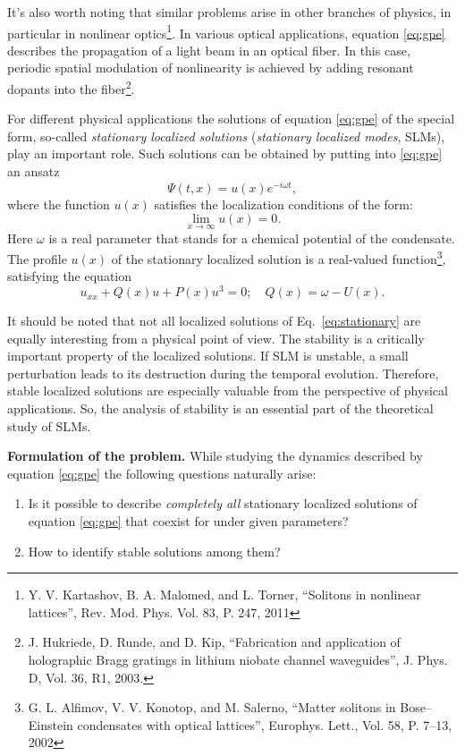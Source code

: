 \documentclass[candidate, href, colorlinks]{disser}
\begin{document}
It's also worth noting that similar problems arise in other branches of physics, in particular in nonlinear optics\footnote{\label{note:turner} Y. V. Kartashov, B. A. Malomed, and L. Torner, ``Solitons in nonlinear lattices'', Rev. Mod. Phys. Vol. 83, P. 247, 2011}.
In various optical applications, equation \eqref{eq:gpe} describes the propagation of a light beam in an optical fiber.
In this case, periodic spatial modulation of nonlinearity is achieved by adding resonant dopants into the fiber\footnote{J. Hukriede, D. Runde, and D. Kip, ``Fabrication and application of holographic Bragg gratings in lithium niobate channel waveguides'', J. Phys. D, Vol. 36, R1, 2003.}.

For different physical applications the solutions of equation \eqref{eq:gpe} of the special form, so-called {\it stationary localized solutions} ({\it stationary localized modes}, SLMs), play an important role.
Such solutions can be obtained by putting into \eqref{eq:gpe} an ansatz
\begin{equation}
	\Psi(t, x) = u(x) e^{-i \omega t},
\label{eq:ansatz}
\end{equation}
where the function $u(x)$ satisfies the localization conditions of the form:
\begin{equation}
	\lim \limits_{x \to \infty} u(x) = 0.
\label{eq:localization}
\end{equation}
Here $\omega$ is a real parameter that stands for a chemical potential of the condensate.
The profile $u(x)$ of the stationary localized solution is a real-valued function\footnote{G. L. Alfimov, V. V. Konotop, and M. Salerno, ``Matter solitons in Bose--Einstein condensates with optical lattices'', Europhys. Lett., Vol. 58, P. 7--13, 2002}, satisfying the equation
\begin{equation}
	u_{xx} + Q(x) u + P(x) u^3 = 0; \quad Q(x) = \omega - U(x).
\label{eq:stationary}
\end{equation}

It should be noted that not all localized solutions of Eq.~\eqref{eq:stationary} are equally interesting from a physical point of view.
The stability is a critically important property of the localized solutions.
If SLM is unstable, a small perturbation leads to its destruction during the temporal evolution.
Therefore, stable localized solutions are especially valuable from the perspective of physical applications.
So, the analysis of stability is an essential part of the theoretical study of SLMs.

\textbf{Formulation of the problem.}
While studying the dynamics described by equation \eqref{eq:gpe} the following questions naturally arise:
\begin{enumerate}
	\item Is it possible to describe {\it completely all} stationary localized solutions of equation \eqref{eq:gpe} that coexist for under given parameters?
	\item How to identify stable solutions among them?
\end{enumerate}
\end{document}

